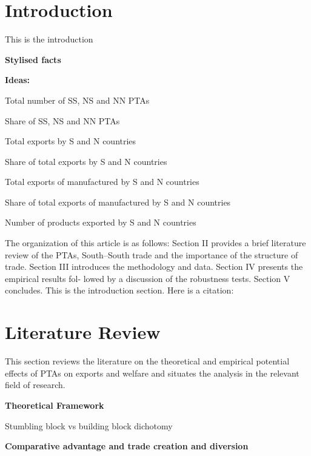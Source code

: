 \documentclass[12pt]{article}%
\begin{document}
%
\newpage%
\listoffigures%
\newpage%
\listoftables%
\newpage%
%
\pagestyle{mainmatter}%
\section{Introduction}%
\label{sec:Introduction}%
This is the introduction

\textbf{Stylised facts}

\textbf{Ideas:}

Total number of SS, NS and NN PTAs

Share of SS, NS and NN PTAs

Total exports by S and N countries

Share of total exports by S and N countries

Total exports of manufactured by S and N countries

Share of total exports of manufactured by S and N countries

Number of products exported by S and N countries

The organization of this article is as follows: Section II provides a
brief literature review of the PTAs, South--South trade and the
importance of the structure of trade. Section III introduces the
methodology and data. Section IV presents the empirical results fol-
lowed by a discussion of the robustness tests. Section V concludes.
%
This is the introduction section. Here is a citation: %
\cite{dahi_preferential_2013}

%
\section{Literature Review}%
\label{sec:LiteratureReview}%
This section reviews the literature on the theoretical and empirical
potential effects of PTAs on exports and welfare and situates the
analysis in the relevant field of research.

\textbf{Theoretical Framework}

Stumbling block vs building block dichotomy

\textbf{Comparative advantage and trade creation and diversion}
\end{document}
